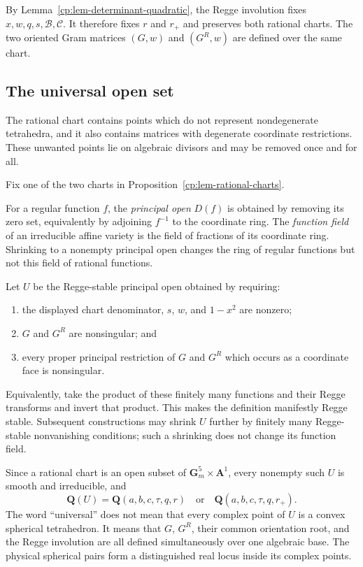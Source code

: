 By Lemma~\ref{cp:lem-determinant-quadratic}, the Regge involution fixes
\(x,w,q,s,\mathcal B,\mathcal C\).  It therefore fixes \(r\) and \(r_+\)
and preserves both rational charts.  The two oriented Gram matrices
\((G,w)\) and \((G^R,w)\) are defined over the same chart.

\subsection{The universal open set}
\label{cp:subsec-universal-open}

The rational chart contains points which do not represent nondegenerate
tetrahedra, and it also contains matrices with degenerate coordinate
restrictions.  These unwanted points lie on algebraic divisors and may be
removed once and for all.

Fix one of the two charts in
Proposition~\ref{cp:lem-rational-charts}.

For a regular function \(f\), the \emph{principal open}
\(D(f)\) is obtained by removing its zero set, equivalently by adjoining
\(f^{-1}\) to the coordinate ring.  The \emph{function field} of an
irreducible affine variety is the field of fractions of its coordinate
ring.  Shrinking to a nonempty principal open changes the ring of regular
functions but not this field of rational functions.

\begin{definition}
\label{cp:def-U}
Let \(U\) be the Regge-stable principal open obtained by requiring:
\begin{enumerate}
\item the displayed chart denominator, \(s\), \(w\), and \(1-x^2\) are
      nonzero;
\item \(G\) and \(G^R\) are nonsingular; and
\item every proper principal restriction of \(G\) and \(G^R\) which occurs
      as a coordinate face is nonsingular.
\end{enumerate}
Equivalently, take the product of these finitely many functions and their
Regge transforms and invert that product.  This makes the definition
manifestly Regge stable.  Subsequent constructions may shrink \(U\) further
by finitely many Regge-stable nonvanishing conditions; such a shrinking does
not change its function field.
\end{definition}

Since a rational chart is an open subset of
\(\mathbf G_m^5\times\mathbf A^1\), every nonempty such \(U\) is smooth and
irreducible, and
\begin{equation}
 \mathbf Q(U)=\mathbf Q(a,b,c,\tau,q,r)
 \quad\text{or}\quad
 \mathbf Q(a,b,c,\tau,q,r_+).
 \label{cp:eq-universal-open-function-field}
\end{equation}
The word ``universal'' does not mean that every complex point of \(U\) is a
convex spherical tetrahedron.  It means that \(G\), \(G^R\), their common
orientation root, and the Regge involution are all defined simultaneously
over one algebraic base.  The physical spherical pairs form a distinguished
real locus inside its complex points.

